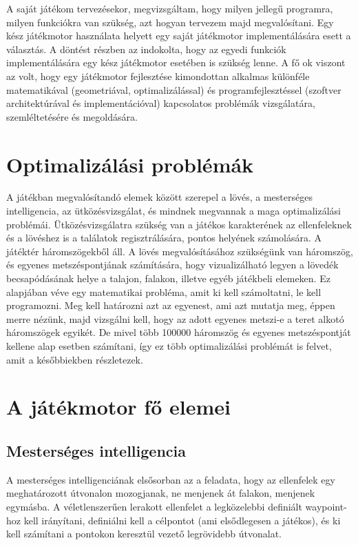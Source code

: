 A saját játékom tervezésekor, megvizsgáltam, hogy milyen jellegű programra, milyen funkciókra van szükség, azt hogyan tervezem majd megvalósítani. Egy kész játékmotor használata helyett egy saját játékmotor implementálására esett a választás. A döntést részben az indokolta, hogy az egyedi funkciók implementálására egy kész játékmotor esetében is szükség lenne. A fő ok viszont az volt, hogy egy játékmotor fejlesztése kimondottan alkalmas különféle matematikával (geometriával, optimalizálással) és programfejlesztéssel (szoftver architektúrával és implementációval)  kapcsolatos problémák vizsgálatára, szemléltetésére és megoldására.

\section{Optimalizálási problémák}

A játékban megvalósítandó elemek között szerepel a lövés, a mesterséges intelligencia, az ütközésvizsgálat, és mindnek megvannak a maga optimalizálási problémái. Ütközésvizsgálatra szükség van a játékos karakterének az ellenfeleknek és a lövéshez is a találatok regisztrálására, pontos helyének számolására. A játéktér háromszögekből áll. A lövés megvalósításához szükségünk van háromszög, és egyenes metszéspontjának számítására, hogy vizualizálható legyen a lövedék becsapódásának helye a talajon, falakon, illetve egyéb játékbeli elemeken. Ez alapjában véve egy matematikai probléma, amit ki kell számoltatni, le kell programozni. Meg kell határozni azt az egyenest, ami azt mutatja meg, éppen merre nézünk, majd vizsgálni kell, hogy az adott egyenes metszi-e a teret alkotó háromszögek egyikét. De mivel több 100000 háromszög és egyenes metszéspontját kellene alap esetben számítani, így ez több optimalizálási problémát is felvet, amit a későbbiekben részletezek.

\section{A játékmotor fő elemei}

\subsection{Mesterséges intelligencia}

A mesterséges intelligenciának elsősorban az a feladata, hogy az ellenfelek egy meghatározott útvonalon mozogjanak, ne menjenek át falakon, menjenek egymásba. A véletlenszerűen lerakott ellenfelet a legközelebbi definiált waypoint-hoz kell irányítani, definiálni kell a célpontot (ami elsődlegesen a játékos), és ki kell számítani a pontokon keresztül vezető legrövidebb útvonalat.


